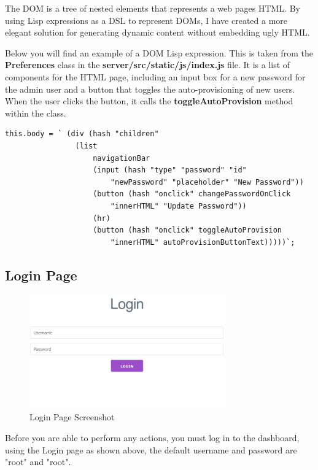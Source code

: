 The DOM is a tree of nested elements that represents a web pages HTML.
By using Lisp expressions as a DSL to represent DOMs,
I have created a more elegant solution for generating dynamic
content without embedding ugly HTML.

Below you will find an example of a DOM Lisp expression.
This is taken from the \textbf{Preferences} class in the
\textbf{server/src/static/js/index.js} file.
It is a list of components for the HTML page,
including an input box for a new password for the admin user
and a button that toggles the auto-provisioning of new users.
When the user clicks the button, it calls the
\textbf{toggleAutoProvision} method within the class.

\begin{lstlisting}
this.body = ` (div (hash "children"
                (list
                    navigationBar
                    (input (hash "type" "password" "id"
                        "newPassword" "placeholder" "New Password"))
                    (button (hash "onclick" changePasswordOnClick
                        "innerHTML" "Update Password"))
                    (hr)
                    (button (hash "onclick" toggleAutoProvision
                        "innerHTML" autoProvisionButtonText)))))`;
\end{lstlisting}

\subsection{Login Page}
\begin{figure}[h!]
    \centering
    \includegraphics[width=0.75\textwidth]{images/screenshots/login_page}
    \caption{Login Page Screenshot}
    \label{image:loginPageScreenshot}
\end{figure}

Before you are able to perform any actions, you must log in to the dashboard,
using the Login page as shown above,
the default username and password are "root" and "root".

